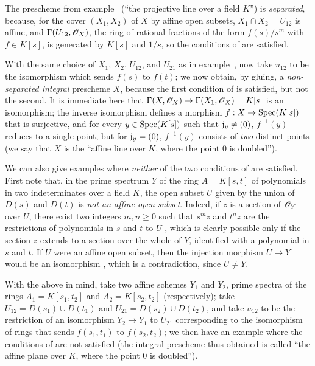 \begin{exm}[5.5.11]
\label{1.5.5.11}
The prescheme from example~ (``the projective line over a field $K$'') is \emph{separated}, because, for the cover $(X_1,X_2)$ of $X$ by affine open subsets, $X_1\cap X_2=U_{12}$ is affine, and $\Gamma(U_{12},\mathscr{O}_X)$, the ring of rational fractions of the form $f(s)/s^m$ with $f\in K[s]$, is generated by $K[s]$ and $1/s$, so the conditions of  are satisfied.

With the same choice of $X_1$, $X_2$, $U_{12}$, and $U_{21}$ as in example~, now take $u_{12}$ to be the isomorphism which sends $f(s)$ to $f(t)$;
we now obtain, by gluing, a \emph{non-separated integral} prescheme $X$, because the first condition of  is satisfied, but not the second.
It is immediate here that $\Gamma(X,\OO_X)\to\Gamma(X_1,\OO_X)=K[s]$ is an isomorphism;
the inverse isomorphism defines a morphism $f:X\to\Spec(K[s])$ that is surjective, and for every $y\in{\mathop{\mathrm{Spec}}\nolimits}(K[s])$ such that $\mathfrak{j}_y\neq(0)$, $f^{-1}(y)$ reduces to a single point, but for $\mathfrak{j}_y=(0)$, $f^{-1}(y)$ consists of \emph{two} distinct points (we say that $X$ is the ``affine line over $K$, where the point $0$ is doubled'').

We can also give examples where \emph{neither} of the two conditions of  are satisfied.
First note that, in the prime spectrum $Y$ of the ring $A=K[s,t]$ of polynomials in two indeterminates over a field $K$, the open subset $U$ given by the union of $D(s)$ and $D(t)$ is \emph{not an affine open subset}.
Indeed, if $z$ is a section of $\mathscr{O}_Y$ over $U$, there exist two integers $m,n\geqslant0$ such that $s^mz$ and $t^nz$ are the restrictions of polynomials in $s$ and $t$ to $U$ , which is clearly possible only if the section $z$ extends to a section over the whole of $Y$, identified with a polynomial in $s$ and $t$.
If $U$ were an affine open subset, then the injection morphism $U\to Y$ would be an isomorphism , which is a contradiction, since $U\neq Y$.

With the above in mind, take two affine schemes $Y_1$ and $Y_2$, prime spectra of the rings $A_1=K[s_1,t_2]$ and $A_2=K[s_2,t_2]$ (respectively);
take $U_{12}=D(s_1)\cup D(t_1)$ and $U_{21}=D(s_2)\cup D(t_2)$, and take $u_{12}$ to be the restriction of an isomorphism $Y_2\to Y_1$ to $U_{21}$ corresponding to the isomorphism of rings that sends $f(s_1,t_1)$ to $f(s_2,t_2)$;
we then have an example where the conditions of  are not satisfied (the integral prescheme thus obtained is called ``the affine plane over $K$, where the point $0$ is doubled'').
\end{exm}

